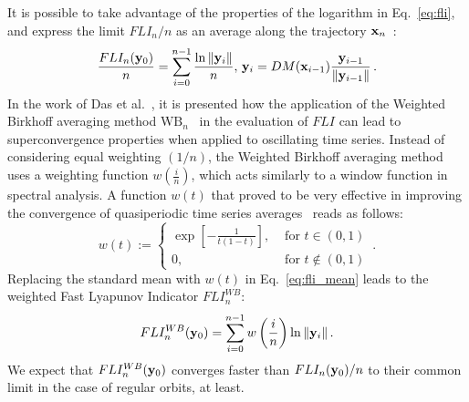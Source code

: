 It is possible to take advantage of the properties of the logarithm in Eq.~\eqref{eq:fli}, and express the limit $FLI_n/n$ as an average along the trajectory $\vb{x}_n$~\cite{Alligood1996}:
%
\begin{equation}
    \frac{FLI_n(\vb{y}_0)}{n} = \sum_{i=0}^{n-1} \frac{\ln{\norm{\vb{y}_i}}}{n},\, \vb{y}_i=DM(\vb{x}_{i-1})\frac{\vb{y}_{i-1}}{\norm{\vb{y}_{i-1}}} \,.
    \label{eq:fli_mean}
\end{equation}
%
In the work of Das et al.~\cite{Das_2017}, it is presented how the application of the Weighted Birkhoff averaging method $\mathrm{WB}_n$~\cite{Das_2018} in the evaluation of $FLI$ can lead to superconvergence properties when applied to oscillating time series. Instead of considering equal weighting $(1/n)$, the Weighted Birkhoff averaging method uses a weighting function $w\left(\frac{i}{n}\right)$, which acts similarly to a window function in spectral analysis. A function $w(t)$ that proved to be very effective in improving the convergence of quasiperiodic time series averages~\cite{Das_2018} reads as follows:
%
\begin{equation}
    w(t):= 
    \begin{cases}
        \exp \left[-\frac{1}{t(1-t)}\right], & \text { for } t \in(0,1) \\ 
        0, & \text { for } t \notin(0,1)
    \end{cases} \,.
    \label{eq:birkhoff}
\end{equation}
%
Replacing the standard mean with $w(t)$ in Eq.~\eqref{eq:fli_mean} leads to the weighted Fast Lyapunov Indicator $FLI_n^{WB}$:
%
\begin{equation}
    FLI_n^{WB}(\vb{y}_0) = \sum_{i=0}^{n-1} w\left(\frac{i}{n}\right) \ln{\norm{\vb{y}_i}} \, .
    \label{eq:fli_birkhoff}
\end{equation}
%
We expect that $FLI_n^{WB}(\vb{y}_0)$ converges faster than $FLI_n(\vb{y}_0)/n$ to their common limit in the case of regular orbits, at least.
%
